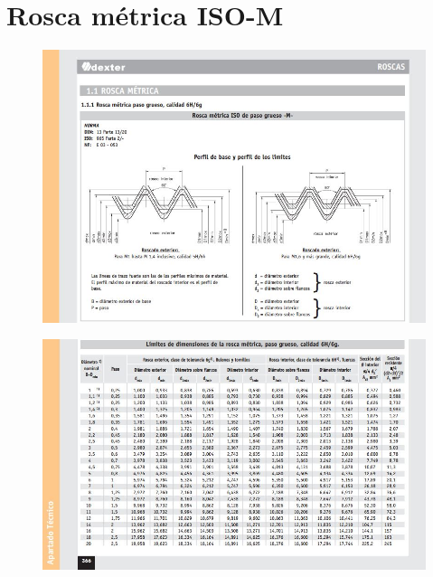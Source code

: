 \chapter{Rosca m\'etrica ISO-M}

\newpage

\begin{figure}[H]
\centering
	\includegraphics[width=\textwidth]{images/Anexos/fig1-1}
\end{figure}
\begin{figure}[H]
\centering
	\includegraphics[width=\textwidth]{images/Anexos/fig1-2}
\end{figure}